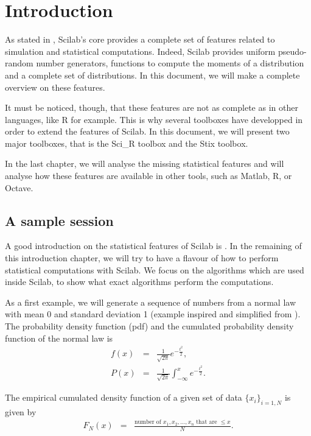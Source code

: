 \chapter{Introduction}

As stated in \cite{scilabstats2001}, Scilab's core provides
a complete set of features related to simulation and statistical
computations.
Indeed, Scilab provides uniform pseudo-random number generators, functions to 
compute the moments of a distribution and a complete set of 
distributions. In this document, we will make a complete 
overview on these features.

It must be noticed, though, that these features
are not as complete as in other languages, like R for example.
This is why several toolboxes have developped in order to extend 
the features of Scilab. In this document, we will present two
major toolboxes, that is the Sci\_R toolbox and the Stix toolbox.

In the last chapter, we will analyse the missing statistical 
features and will analyse how these features are available in other
tools, such as Matlab, R, or Octave.

\section{A sample session}

A good introduction on the statistical features of Scilab is \cite{scilabintro2007}.
In the remaining of this introduction chapter, we will try to have 
a flavour of how to perform statistical computations with Scilab.
We focus on the algorithms which are used inside Scilab, to show what 
exact algorithms perform the computations.

As a first example, we will generate a sequence of numbers from a 
normal law with mean 0 and standard deviation 1 (example inspired and simplified 
from \cite{scilabintro2007}). The probability density function (pdf) 
and the cumulated probability density function of the normal law is 
\begin{eqnarray}
f(x) &=& \frac{1}{\sqrt{2\pi}} e^{-\frac{t^2}{2}},\\
P(x) &=& \frac{1}{\sqrt{2\pi}} \int_{-\infty}^x e^{-\frac{t^2}{2}}.
\end{eqnarray}

The empirical cumulated density function \cite{artcomputerKnuthVol2} of a given
set of data $\{x_i\}_{i=1,N}$ is given by 
\begin{eqnarray}
F_N(x) &=& \frac{\textrm{number of } x_1,x_2,\ldots,x_n \textrm{ that are }\leq x}{N}.
\end{eqnarray}


